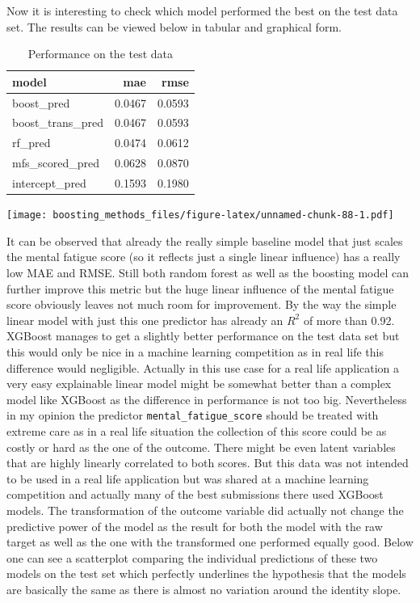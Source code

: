 \documentclass[
]{book}
\begin{document}
Now it is interesting to check which model performed the best on the test data set. The results can be viewed below in tabular and graphical form.

\begin{table}

\caption{\label{tab:perfBurn}Performance on the test data}
\centering
\begin{tabular}[t]{lrr}
\toprule
model & mae & rmse\\
\midrule
boost\_pred & 0.0467 & 0.0593\\
boost\_trans\_pred & 0.0467 & 0.0593\\
rf\_pred & 0.0474 & 0.0612\\
mfs\_scored\_pred & 0.0628 & 0.0870\\
intercept\_pred & 0.1593 & 0.1980\\
\bottomrule
\end{tabular}
\end{table}

\texttt{[image: boosting\_methods\_files/figure-latex/unnamed-chunk-88-1.pdf]}

It can be observed that already the really simple baseline model that just scales the mental fatigue score (so it reflects just a single linear influence) has a really low MAE and RMSE. Still both random forest as well as the boosting model can further improve this metric but the huge linear influence of the mental fatigue score obviously leaves not much room for improvement. By the way the simple linear model with just this one predictor has already an \(R^2\) of more than 0.92. XGBoost manages to get a slightly better performance on the test data set but this would only be nice in a machine learning competition as in real life this difference would negligible. Actually in this use case for a real life application a very easy explainable linear model might be somewhat better than a complex model like XGBoost as the difference in performance is not too big. Nevertheless in my opinion the predictor \texttt{mental\_fatigue\_score} should be treated with extreme care as in a real life situation the collection of this score could be as costly or hard as the one of the outcome. There might be even latent variables that are highly linearly correlated to both scores. But this data was not intended to be used in a real life application but was shared at a machine learning competition and actually many of the best submissions there used XGBoost models. The transformation of the outcome variable did actually not change the predictive power of the model as the result for both the model with the raw target as well as the one with the transformed one performed equally good. Below one can see a scatterplot comparing the individual predictions of these two models on the test set which perfectly underlines the hypothesis that the models are basically the same as there is almost no variation around the identity slope.
\end{document}
